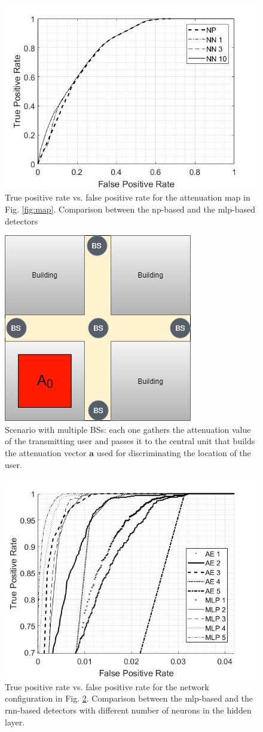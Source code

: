 \documentclass[draftcls,onecolumn,12pt]{IEEEtran}
\begin{document}
\begin{figure}
    \centering
    \includegraphics[width=0.5\columnwidth]{trueMap.jpg}
    \caption{True positive rate vs. false positive rate for the attenuation map in Fig. \ref{fig:map}. Comparison between the \ac{np}-based and the \ac{mlp}-based detectors}
    \label{fig:trueMap}
\end{figure}

\begin{figure}
    \centering
    \includegraphics[width=0.3\columnwidth]{scenario2.png}
    \caption{Scenario with multiple BSs: each one gathers the attenuation value of the transmitting user and passes it to the central unit that builds the attenuation vector $\bm{a}$ used for discriminating the location of the user.}
    \label{fig:mBS}
\end{figure}

\begin{figure}
    \centering
    \includegraphics[width=0.5\columnwidth]{RNNvsMLPnNeur.jpg}
    \caption{True positive rate vs. false positive rate for the network configuration in Fig. \ref{fig:mBS}. Comparison between the \ac{mlp}-based and the \ac{rnn}-based detectors with different number of neurons in the hidden layer.}
    \label{fig:rnnMLP}
\end{figure}
\end{document}
